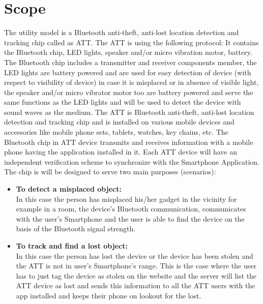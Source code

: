 \documentclass[a4paper,10pt]{report}
\begin{document}
\chapter{Scope}
The utility model is a Bluetooth anti-theft, anti-lost location detection and tracking chip called as ATT. The ATT is using the following protocol: It contains the Bluetooth chip, LED lights, speaker and/or micro vibration motor, battery. The Bluetooth chip includes a transmitter and receiver components member,
the LED lights are battery powered and are used for easy detection of device (with respect to visibility of device) in case it is misplaced or in absence of visible light, the speaker and/or micro vibrator motor too are battery powered and serve the same functions as the LED lights and will be used to detect the device with sound waves as the medium.
The ATT is Bluetooth anti-theft, anti-lost location detection and tracking chip and is installed on various mobile devices and accessories like mobile phone sets, tablets, watches, key chains, etc. The Bluetooth chip in ATT device transmits and receives information with a mobile phone having the application installed in it. Each ATT device will have an independent verification scheme to synchronize with the Smartphone Application.\\
\newpage
The chip is will be designed to serve two main purposes (scenarios):
\begin{itemize}
\item \textbf{To detect a misplaced object:}\\In this case the person has misplaced his/her gadget in the vicinity for example in a room, the device’s Bluetooth communication, communicates with the user’s Smartphone and the user is able to find the device on the basis of the Bluetooth signal strength.
\item \textbf{To track and find a lost object:}\\In this case the person has lost the device or the device has been stolen and the ATT is not in user’s Smartphone’s range. This is the case where the user has to just tag the device as stolen on the website and the server will list the ATT device as lost and sends this information to all the ATT users with the app installed and keeps their phone on lookout for the lost.
\end{itemize}
\end{document}
